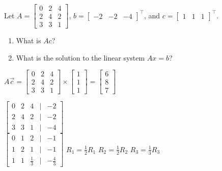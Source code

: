 \documentclass{article}
\begin{document}
\begin{aprob}\label{prob:linsystem}
    Let $A = \begin{bmatrix} 0 & 2 & 4 \\ 2 & 4 & 2 \\ 3 & 3 & 1 \end{bmatrix}$, $b = \begin{bmatrix} -2 & -2 & -4 \end{bmatrix}^\top$, and $c=\begin{bmatrix} 1 & 1 & 1 \end{bmatrix}^\top$.
    \begin{enumerate}
    	\item {} What is $Ac$?
    	\item {} What is the solution to the linear system $Ax = b$?
    \end{enumerate}
    \begin{tcolorbox}[colback=lightgray!10!white, colframe=black, title=A6.a]
    $A\vec{c} = \begin{bmatrix} 0 & 2 & 4 \\ 2 & 4 & 2 \\ 3 & 3 & 1 \end{bmatrix} \times \begin{bmatrix} 1 \\ 1 \\ 1 \end{bmatrix} = \begin{bmatrix} 6 \\ 8 \\ 7 \end{bmatrix}$
    \vspace{1em} \\
    \end{tcolorbox}
    \begin{tcolorbox}[colback=lightgray!10!white, colframe=black, title=A6.b]
    $\begin{bmatrix} 0 & 2 & 4 & | & -2 \\ 2 & 4 & 2 & | & -2 \\ 3 & 3 & 1 & | & -4 \end{bmatrix}$
    \vspace{1em} \\
    $\begin{bmatrix} 0 & 1 & 2 & | & -1 \\ 1 & 2 & 1 & | & -1 \\ 1 & 1 & \frac{1}{3} & | & -\frac{4}{3} \end{bmatrix}$ 
    $R_1 = \frac{1}{2}R_1$ \quad $R_2 = \frac{1}{2}R_2$ \quad $R_3 = \frac{1}{3}R_3$

\end{tcolorbox}
\end{aprob}
\end{document}
